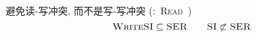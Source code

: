 \begin{frame}{}

  \vspace{0.30cm}
  \begin{center}
	\nmsi{}
  \end{center}
\end{frame}

\begin{frame}{}

  \vspace{0.60cm}
  \begin{center}
	\wsi{} 避免读-写冲突, 而不是写-写冲突 (\si: \textsc{Read}\si)

	\[
	  \textsc{WriteSI} \subseteq \textsc{SER} \qquad
	  \textsc{SI} \not\subset \textsc{SER}
	\]
  \end{center}
\end{frame}
